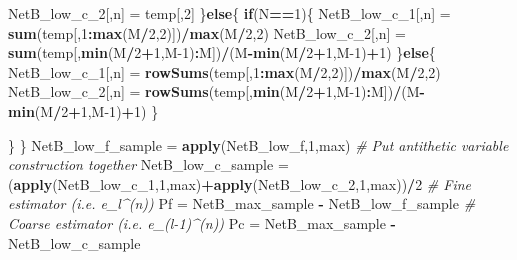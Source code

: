 \documentclass[
]{article}
\newenvironment{Shaded}{\begin{snugshade}}{\end{snugshade}}
\newcommand{\CommentTok}[1]{\textcolor[rgb]{0.56,0.35,0.01}{\textit{#1}}}
\newcommand{\ControlFlowTok}[1]{\textcolor[rgb]{0.13,0.29,0.53}{\textbf{#1}}}
\newcommand{\DecValTok}[1]{\textcolor[rgb]{0.00,0.00,0.81}{#1}}
\newcommand{\KeywordTok}[1]{\textcolor[rgb]{0.13,0.29,0.53}{\textbf{#1}}}
\newcommand{\NormalTok}[1]{#1}
\newcommand{\OperatorTok}[1]{\textcolor[rgb]{0.81,0.36,0.00}{\textbf{#1}}}
\newcommand{\StringTok}[1]{\textcolor[rgb]{0.31,0.60,0.02}{#1}}
\begin{document}
\begin{Shaded}
\begin{Highlighting}[]
{\NormalTok{      NetB_low_c_}\DecValTok{2}\NormalTok{[,n] =}\StringTok{ }\NormalTok{temp[,}\DecValTok{2}\NormalTok{]}
\NormalTok{    \}}\ControlFlowTok{else}\NormalTok{\{}
      \ControlFlowTok{if}\NormalTok{(N}\OperatorTok{==}\DecValTok{1}\NormalTok{)\{}
\NormalTok{        NetB_low_c_}\DecValTok{1}\NormalTok{[,n] =}\StringTok{ }\KeywordTok{sum}\NormalTok{(temp[,}\DecValTok{1}\OperatorTok{:}\KeywordTok{max}\NormalTok{(M}\OperatorTok{/}\DecValTok{2}\NormalTok{,}\DecValTok{2}\NormalTok{)])}\OperatorTok{/}\KeywordTok{max}\NormalTok{(M}\OperatorTok{/}\DecValTok{2}\NormalTok{,}\DecValTok{2}\NormalTok{)}
\NormalTok{        NetB_low_c_}\DecValTok{2}\NormalTok{[,n] =}\StringTok{ }\KeywordTok{sum}\NormalTok{(temp[,}\KeywordTok{min}\NormalTok{(M}\OperatorTok{/}\DecValTok{2}\OperatorTok{+}\DecValTok{1}\NormalTok{,M}\DecValTok{-1}\NormalTok{)}\OperatorTok{:}\NormalTok{M])}\OperatorTok{/}\NormalTok{(M}\OperatorTok{-}\KeywordTok{min}\NormalTok{(M}\OperatorTok{/}\DecValTok{2}\OperatorTok{+}\DecValTok{1}\NormalTok{,M}\DecValTok{-1}\NormalTok{)}\OperatorTok{+}\DecValTok{1}\NormalTok{)  }
\NormalTok{      \}}\ControlFlowTok{else}\NormalTok{\{}
\NormalTok{        NetB_low_c_}\DecValTok{1}\NormalTok{[,n] =}\StringTok{ }\KeywordTok{rowSums}\NormalTok{(temp[,}\DecValTok{1}\OperatorTok{:}\KeywordTok{max}\NormalTok{(M}\OperatorTok{/}\DecValTok{2}\NormalTok{,}\DecValTok{2}\NormalTok{)])}\OperatorTok{/}\KeywordTok{max}\NormalTok{(M}\OperatorTok{/}\DecValTok{2}\NormalTok{,}\DecValTok{2}\NormalTok{)}
\NormalTok{        NetB_low_c_}\DecValTok{2}\NormalTok{[,n] =}\StringTok{ }\KeywordTok{rowSums}\NormalTok{(temp[,}\KeywordTok{min}\NormalTok{(M}\OperatorTok{/}\DecValTok{2}\OperatorTok{+}\DecValTok{1}\NormalTok{,M}\DecValTok{-1}\NormalTok{)}\OperatorTok{:}\NormalTok{M])}\OperatorTok{/}\NormalTok{(M}\OperatorTok{-}\KeywordTok{min}\NormalTok{(M}\OperatorTok{/}\DecValTok{2}\OperatorTok{+}\DecValTok{1}\NormalTok{,M}\DecValTok{-1}\NormalTok{)}\OperatorTok{+}\DecValTok{1}\NormalTok{)        }
\NormalTok{      \}}

\NormalTok{    \}}
\NormalTok{  \}}
\NormalTok{  NetB_low_f_sample =}\StringTok{ }\KeywordTok{apply}\NormalTok{(NetB_low_f,}\DecValTok{1}\NormalTok{,max)}
  \CommentTok{# Put antithetic variable construction together}
\NormalTok{  NetB_low_c_sample =}\StringTok{ }\NormalTok{(}\KeywordTok{apply}\NormalTok{(NetB_low_c_}\DecValTok{1}\NormalTok{,}\DecValTok{1}\NormalTok{,max)}\OperatorTok{+}\KeywordTok{apply}\NormalTok{(NetB_low_c_}\DecValTok{2}\NormalTok{,}\DecValTok{1}\NormalTok{,max))}\OperatorTok{/}\DecValTok{2}
  \CommentTok{# Fine estimator (i.e. e_l^(n))}
\NormalTok{  Pf =}\StringTok{ }\NormalTok{NetB_max_sample }\OperatorTok{-}\StringTok{ }\NormalTok{NetB_low_f_sample}
  \CommentTok{# Coarse estimator (i.e. e_(l-1)^(n))}
\NormalTok{  Pc =}\StringTok{ }\NormalTok{NetB_max_sample }\OperatorTok{-}\StringTok{ }\NormalTok{NetB_low_c_sample}
  
}
\end{Highlighting}
\end{Shaded}
\end{document}
